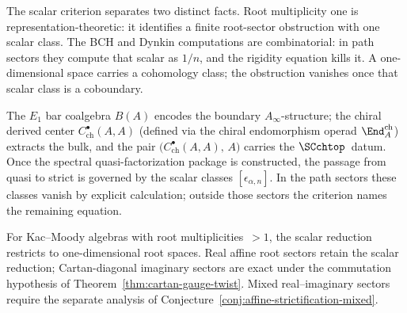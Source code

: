 \begin{remark}
\label{rem:root-mult-one-hero}
The scalar criterion separates two distinct facts. Root multiplicity
one is representation-theoretic: it identifies a finite root-sector
obstruction with one scalar class. The BCH and Dynkin computations are
combinatorial: in path sectors they compute that scalar as $1/n$, and
the rigidity equation kills it. A one-dimensional space carries a
cohomology class; the obstruction vanishes once that scalar class is a
coboundary.

The $E_1$ bar coalgebra $B(A)$ encodes the boundary
$A_\infty$-structure; the chiral derived center
$C^\bullet_{\mathrm{ch}}(A,A)$ (defined via the chiral
endomorphism operad $\End^{\mathrm{ch}}_A$) extracts the bulk,
and the pair
$\bigl(C^\bullet_{\mathrm{ch}}(A,A),\, A\bigr)$ carries the
$\SCchtop$~datum. Once the spectral quasi-factorization package is
constructed, the passage from quasi to strict is governed by the
scalar classes $[\epsilon_{\alpha,n}]$. In the path sectors these
classes vanish by explicit calculation; outside those sectors the
criterion names the remaining equation.

For Kac--Moody algebras with root multiplicities~$>1$, the scalar
reduction restricts to one-dimensional root spaces. Real affine root
sectors retain the scalar reduction; Cartan-diagonal imaginary sectors
are exact under the commutation hypothesis of
Theorem~\ref{thm:cartan-gauge-twist}. Mixed real--imaginary sectors
require the separate analysis of
Conjecture~\ref{conj:affine-strictification-mixed}.
\end{remark}

